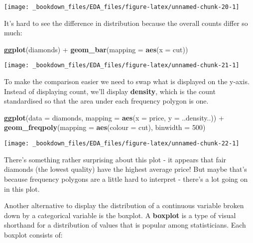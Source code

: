 \documentclass[]{book}
\newenvironment{Shaded}{\begin{snugshade}}{\end{snugshade}}
\newcommand{\KeywordTok}[1]{\textcolor[rgb]{0.13,0.29,0.53}{\textbf{{#1}}}}
\newcommand{\DataTypeTok}[1]{\textcolor[rgb]{0.13,0.29,0.53}{{#1}}}
\newcommand{\DecValTok}[1]{\textcolor[rgb]{0.00,0.00,0.81}{{#1}}}
\newcommand{\StringTok}[1]{\textcolor[rgb]{0.31,0.60,0.02}{{#1}}}
\newcommand{\NormalTok}[1]{{#1}}
\begin{document}
\begin{center}\texttt{[image: \_bookdown\_files/EDA\_files/figure-latex/unnamed-chunk-20-1]} \end{center}

It's hard to see the difference in distribution because the overall
counts differ so much:

\begin{Shaded}
\begin{Highlighting}[]
\KeywordTok{ggplot}\NormalTok{(diamonds) +}\StringTok{ }
\StringTok{  }\KeywordTok{geom_bar}\NormalTok{(}\DataTypeTok{mapping =} \KeywordTok{aes}\NormalTok{(}\DataTypeTok{x =} \NormalTok{cut))}
\end{Highlighting}
\end{Shaded}

\begin{center}\texttt{[image: \_bookdown\_files/EDA\_files/figure-latex/unnamed-chunk-21-1]} \end{center}

To make the comparison easier we need to swap what is displayed on the
y-axis. Instead of displaying count, we'll display \textbf{density},
which is the count standardised so that the area under each frequency
polygon is one.

\begin{Shaded}
\begin{Highlighting}[]
\KeywordTok{ggplot}\NormalTok{(}\DataTypeTok{data =} \NormalTok{diamonds, }\DataTypeTok{mapping =} \KeywordTok{aes}\NormalTok{(}\DataTypeTok{x =} \NormalTok{price, }\DataTypeTok{y =} \NormalTok{..density..)) +}\StringTok{ }
\StringTok{  }\KeywordTok{geom_freqpoly}\NormalTok{(}\DataTypeTok{mapping =} \KeywordTok{aes}\NormalTok{(}\DataTypeTok{colour =} \NormalTok{cut), }\DataTypeTok{binwidth =} \DecValTok{500}\NormalTok{)}
\end{Highlighting}
\end{Shaded}

\begin{center}\texttt{[image: \_bookdown\_files/EDA\_files/figure-latex/unnamed-chunk-22-1]} \end{center}

There's something rather surprising about this plot - it appears that
fair diamonds (the lowest quality) have the highest average price! But
maybe that's because frequency polygons are a little hard to interpret -
there's a lot going on in this plot.

Another alternative to display the distribution of a continuous variable
broken down by a categorical variable is the boxplot. A \textbf{boxplot}
is a type of visual shorthand for a distribution of values that is
popular among statisticians. Each boxplot consists of:
\end{document}
